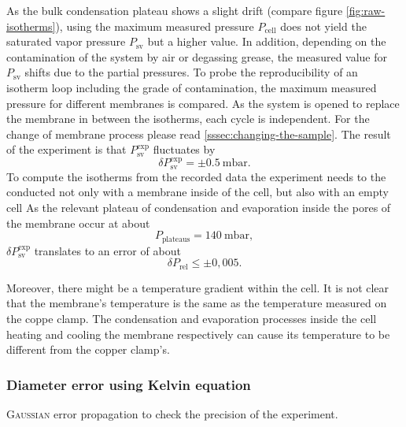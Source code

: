 \documentclass[../thesis.tex]{subfiles}
\begin{document}
        As the bulk condensation plateau shows a slight drift (compare figure \cref{fig:raw-isotherms}), using the maximum measured pressure $P_\mathrm{cell}$ does not yield the saturated vapor pressure $P_\mathrm{sv}$ but a higher value. In addition, depending on the contamination of the system by air or degassing grease, the measured value for $P_\mathrm{sv}$ shifts due to the partial pressures. To probe the reproducibility of an isotherm loop including the grade of contamination, the maximum measured pressure for different membranes is compared. As the system is opened to replace the membrane in between the isotherms, each cycle is independent. For the change of membrane process please read \cref{sssec:changing-the-sample}. The result of the experiment is that $P_\mathrm{sv}^\mathrm{exp}$ fluctuates by
        \begin{equation*}
            \delta P_\mathrm{sv}^\mathrm{exp} = \pm \SI{0,5}{\milli\bar}.
            \label{eq:delta-Psat}
        \end{equation*}
      To compute the isotherms from the recorded data the experiment needs to the conducted not only with a membrane inside of the cell, but also with an empty cell
        As the relevant plateau of condensation and evaporation inside the pores of the membrane occur at about
        \begin{equation*}
            P_\mathrm{plateaus} = \SI{140}{\milli\bar},
        \end{equation*}
        $\delta P_\mathrm{sv}^\mathrm{exp}$ translates to an error of about
        \begin{equation*}
            \delta P_\mathrm{rel} \le \pm 0,005.
            \label{eq:delta-Prel}
        \end{equation*}
        \medskip

        Moreover, there might be a temperature gradient within the cell. It is not clear that the membrane's temperature is the same as the temperature measured on the coppe clamp. The condensation and evaporation processes inside the cell heating and cooling the membrane respectively can cause its temperature to be different from the copper clamp's.


      \subsubsection{Diameter error using Kelvin equation}

        \textsc{Gaussian} error propagation to check the precision of the experiment.
\end{document}
